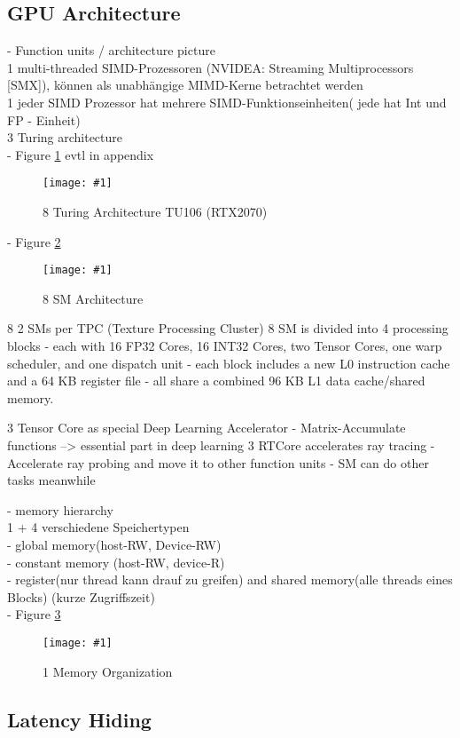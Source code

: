 \documentclass[a4paper,12pt]{llncs}
\numberwithin{equation}{section}
\newcommand{\bild}[4]{
  \begin{figure}[htbp]
    \begin{center}
      \texttt{[image: \#1]}
      \caption[#4]{#3}
      \label{#2}
    \end{center}
  \end{figure}
}
\newcommand{\bildbreite}[5]{
  \begin{figure}[htbp]
    \begin{center}
      \texttt{[image: \#1]}
      \caption[#5]{#4}
      \label{#3}
    \end{center}
  \end{figure}
}
\begin{document}
\subsection{GPU Architecture}
    - Function units / architecture picture\\
      1 multi-threaded SIMD-Prozessoren (NVIDEA: Streaming Multiprocessors [SMX]), können als unabhängige MIMD-Kerne betrachtet werden\\
      1 jeder SIMD Prozessor hat mehrere SIMD-Funktionseinheiten( jede hat Int und FP - Einheit)\\
	  3 Turing architecture\\
	  - Figure \ref{fig:turingOverall} evtl in appendix\\
	  \bildbreite{figures/Turing_architecture.JPG}{\textwidth}{fig:turingOverall}{8 Turing Architecture TU106 (RTX2070)}{}
	  - Figure \ref{fig:smArch}
	  \bildbreite{figures/SM_arch.jpg}{9cm}{fig:smArch}{8 SM Architecture}{}
	  8 2 SMs per TPC (Texture Processing Cluster)
	  8 SM is divided into 4 processing blocks
	    - each with 16 FP32 Cores, 16 INT32 Cores, two Tensor Cores, one warp scheduler, and one dispatch unit
	    - each block includes a new L0 instruction cache and a 64 KB register file
	    - all share a combined 96 KB L1 data cache/shared memory.

	  3 Tensor Core as special Deep Learning Accelerator
	    - Matrix-Accumulate functions --> essential part in deep learning
	  3 RTCore accelerates ray tracing
	    - Accelerate ray probing and move it to other function units
	    - SM can do other tasks meanwhile
	  
	  
    - memory hierarchy\\
      1 + 4 verschiedene Speichertypen\\
        - global memory(host-RW, Device-RW)\\
        - constant memory (host-RW, device-R)\\
        - register(nur thread kann drauf zu greifen) and shared memory(alle threads eines Blocks) (kurze Zugriffszeit)\\
        - Figure \ref{fig:memorga}
    \bild{figures/speicheroragnisation.jpg}{fig:memorga}{1 Memory Organization}{}
        
\subsection{Latency Hiding}
  
\end{document}

